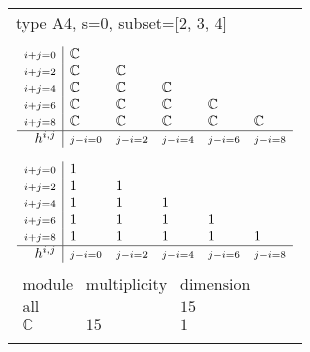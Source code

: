 \documentclass[crop,border=2mm]{standalone}
\begin{document}
\begin{tabular}{l}
{\huge type A4, s=0, subset=[2, 3, 4]}\\ \\


$\displaystyle
\begin{array}{r|l l l l l}
	{\scriptstyle i+j=0}&\mathbb{C}&&&&\\
	{\scriptstyle i+j=2}&\mathbb{C}&\mathbb{C}&&&\\
	{\scriptstyle i+j=4}&\mathbb{C}&\mathbb{C}&\mathbb{C}&&\\
	{\scriptstyle i+j=6}&\mathbb{C}&\mathbb{C}&\mathbb{C}&\mathbb{C}&\\
	{\scriptstyle i+j=8}&\mathbb{C}&\mathbb{C}&\mathbb{C}&\mathbb{C}&\mathbb{C}\\
	\hline h^{i,j}&{\scriptstyle j-i=0}&{\scriptstyle j-i=2}&{\scriptstyle j-i=4}&{\scriptstyle j-i=6}&{\scriptstyle j-i=8}
\end{array}
$ \\ \\


$\displaystyle
\begin{array}{r|l l l l l}
	{\scriptstyle i+j=0}&1&&&&\\
	{\scriptstyle i+j=2}&1&1&&&\\
	{\scriptstyle i+j=4}&1&1&1&&\\
	{\scriptstyle i+j=6}&1&1&1&1&\\
	{\scriptstyle i+j=8}&1&1&1&1&1\\
	\hline h^{i,j}&{\scriptstyle j-i=0}&{\scriptstyle j-i=2}&{\scriptstyle j-i=4}&{\scriptstyle j-i=6}&{\scriptstyle j-i=8}
\end{array}
$ \\ \\


$\displaystyle
\begin{array}{rll}
	\text{module}&\text{multiplicity}&\text{dimension} \\ \hline \text{all}&&15 \\
	\mathbb{C}&15&1
\end{array}
$ \\ \\

\end{tabular}
\end{document}
